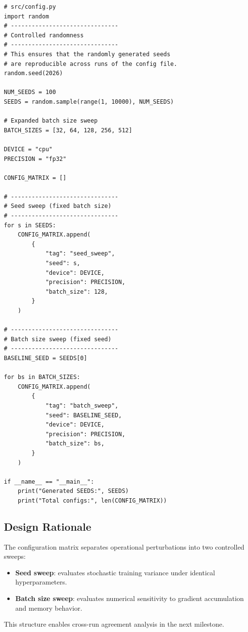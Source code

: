 \documentclass[11pt]{article}
\begin{document}
\begin{lstlisting}[style=pythonstyle, caption={Week 2 Configuration Matrix (src/config.py)}]
# src/config.py
import random
# -------------------------------
# Controlled randomness
# -------------------------------
# This ensures that the randomly generated seeds
# are reproducible across runs of the config file.
random.seed(2026)

NUM_SEEDS = 100
SEEDS = random.sample(range(1, 10000), NUM_SEEDS)

# Expanded batch size sweep
BATCH_SIZES = [32, 64, 128, 256, 512]

DEVICE = "cpu"
PRECISION = "fp32"

CONFIG_MATRIX = []

# -------------------------------
# Seed sweep (fixed batch size)
# -------------------------------
for s in SEEDS:
    CONFIG_MATRIX.append(
        {
            "tag": "seed_sweep",
            "seed": s,
            "device": DEVICE,
            "precision": PRECISION,
            "batch_size": 128,
        }
    )

# -------------------------------
# Batch size sweep (fixed seed)
# -------------------------------
BASELINE_SEED = SEEDS[0]

for bs in BATCH_SIZES:
    CONFIG_MATRIX.append(
        {
            "tag": "batch_sweep",
            "seed": BASELINE_SEED,
            "device": DEVICE,
            "precision": PRECISION,
            "batch_size": bs,
        }
    )

if __name__ == "__main__":
    print("Generated SEEDS:", SEEDS)
    print("Total configs:", len(CONFIG_MATRIX))
\end{lstlisting}
\subsection*{Design Rationale}

The configuration matrix separates operational perturbations into two controlled sweeps:
\begin{itemize}
    \item \textbf{Seed sweep}: evaluates stochastic training variance under identical hyperparameters.
    \item \textbf{Batch size sweep}: evaluates numerical sensitivity to gradient accumulation and memory behavior.
\end{itemize}

This structure enables cross-run agreement analysis in the next milestone.
\end{document}
